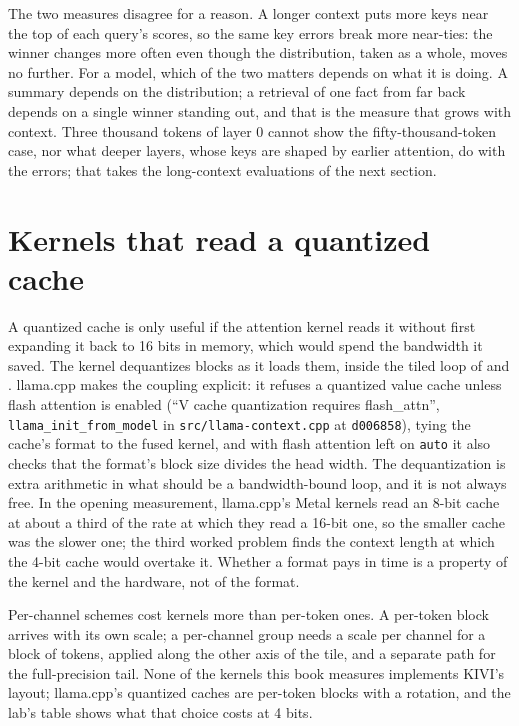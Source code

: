 The two measures disagree for a reason. A longer context puts more keys near the
top of each query's scores, so the same key errors break more near-ties: the
winner changes more often even though the distribution, taken as a whole, moves
no further. For a model, which of the two matters depends on what it is doing.
A summary depends on the distribution; a retrieval of one fact from far back
depends on a single winner standing out, and that is the measure that grows with
context. Three thousand tokens of layer 0 cannot show the fifty-thousand-token
case, nor what deeper layers, whose keys are shaped by earlier attention, do with
the errors; that takes the long-context evaluations of the next section.

\section{Kernels that read a quantized cache}

A quantized cache is only useful if the attention kernel reads it without
first expanding it back to 16 bits in memory, which would spend the bandwidth it
saved. The kernel dequantizes blocks as it loads them, inside the tiled loop of
 and . llama.cpp makes the
coupling explicit: it refuses a quantized value cache unless flash attention is
enabled (``V cache quantization requires flash\_attn'', \texttt{llama\_init\_from\_model}
in \texttt{src/llama-context.cpp} at \texttt{d006858}), tying the cache's format to
the fused kernel, and with flash attention left on \texttt{auto} it also checks
that the format's block size divides the head width. The dequantization is
extra arithmetic in what should be a bandwidth-bound loop, and it is not always
free. In the opening measurement, llama.cpp's Metal kernels read an 8-bit cache
at about a third of the rate at which they read a 16-bit one, so the smaller
cache was the slower one; the third worked problem finds the context length at
which the 4-bit cache would overtake it. Whether a format pays in time is a
property of the kernel and the hardware, not of the format.

Per-channel schemes cost kernels more than per-token ones. A per-token block
arrives with its own scale; a per-channel group needs a scale per channel for a
block of tokens, applied along the other axis of the tile, and a separate path
for the full-precision tail. None of the kernels this book measures implements
KIVI's layout; llama.cpp's quantized caches are per-token blocks with a
rotation, and the lab's table shows what that choice costs at 4 bits.

